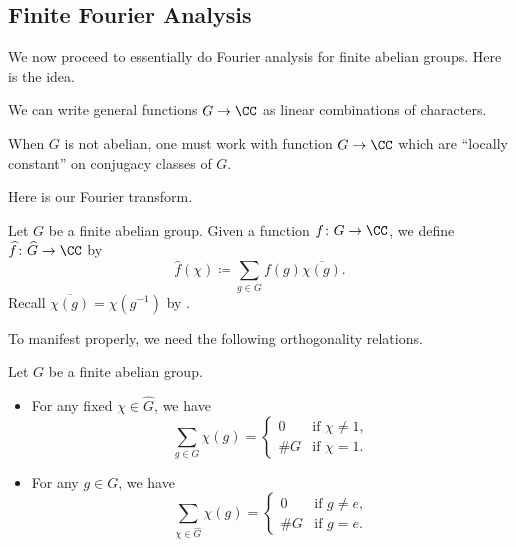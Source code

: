 \documentclass[../notes.tex]{subfiles}
\begin{document}
\subsection{Finite Fourier Analysis}
We now proceed to essentially do Fourier analysis for finite abelian groups. Here is the idea.
\begin{idea} \label{idea:rep-theory}
	We can write general functions $G\to\CC$ as linear combinations of characters.
\end{idea}
\begin{remark}
	When $G$ is not abelian, one must work with function $G\to\CC$ which are ``locally constant'' on conjugacy classes of $G$.
\end{remark}
Here is our Fourier transform.
\begin{notation}
	Let $G$ be a finite abelian group. Given a function $f\colon G\to\CC$, we define $\widehat{f}\colon \widehat{G}\to\CC$ by
	\[\widehat{f}(\chi)\coloneqq\sum_{g\in G}f(g)\overline{\chi(g)}.\]
	Recall $\overline{\chi(g)}=\chi\left(g^{-1}\right)$ by .
\end{notation}
To manifest  properly, we need the following orthogonality relations.
\begin{proposition} \label{prop:ortho-relations}
	Let $G$ be a finite abelian group.
	\begin{itemize}
		\item For any fixed $\chi\in \widehat{G}$, we have
		\[\sum_{g\in G}\chi(g)=\begin{cases}
			0 & \text{if }\chi\ne1, \\
			\#G & \text{if }\chi=1.
		\end{cases}\]
		\item For any $g\in G$, we have
		\[\sum_{\chi\in \widehat{G}}\chi(g)=\begin{cases}
			0 & \text{if }g\ne e, \\
			\#G & \text{if }g=e.
		\end{cases}\]
	\end{itemize}
\end{proposition}
\end{document}
